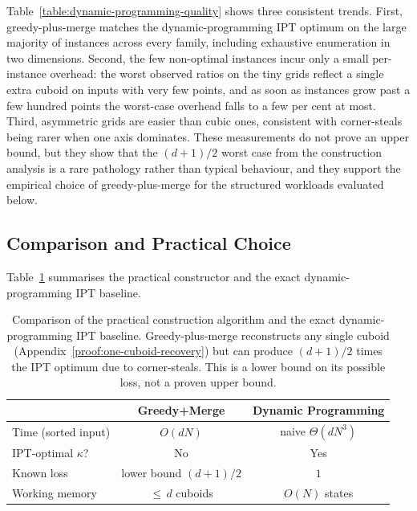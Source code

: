 \documentclass[manuscript,screen,review]{acmart}
\theoremstyle{definition}
\theoremstyle{plain}
\begin{document}
Table~\ref{table:dynamic-programming-quality} shows three consistent
trends. First, greedy-plus-merge matches the dynamic-programming
IPT optimum on the large majority of instances across every family,
including exhaustive enumeration in two dimensions. Second, the few
non-optimal instances incur only a small per-instance overhead: the
worst observed ratios on the tiny grids reflect a single extra cuboid
on inputs with very few points, and as soon as instances grow past a
few hundred points the worst-case overhead falls to a few per cent at
most. Third, asymmetric grids are easier than cubic ones, consistent
with corner-steals being rarer when one axis dominates. These
measurements do not prove an upper bound, but they show that the
$(d{+}1)/2$ worst case from the construction analysis is a rare
pathology rather than typical behaviour, and they support the
empirical choice of greedy-plus-merge for the structured workloads
evaluated below.

\subsection{Comparison and Practical Choice}

Table~\ref{table:algorithm-comparison} summarises the practical
constructor and the exact dynamic-programming IPT baseline.

\begin{table}[ht]
\begin{tabular}{lcc}
\toprule
 & Greedy+Merge & Dynamic Programming \\
\midrule
Time (sorted input) & $O(dN)$ & naive $\Theta(dN^3)$ \\
IPT-optimal $\kappa$? & No & Yes \\
Known loss & lower bound $(d{+}1)/2$ & $1$ \\
Working memory & ${\leq}\,d$ cuboids & $O(N)$ states \\
\bottomrule
\end{tabular}
\caption{Comparison of the practical construction algorithm and the
exact dynamic-programming IPT baseline. Greedy-plus-merge reconstructs any
single cuboid (Appendix~\ref{proof:one-cuboid-recovery}) but can
produce $(d{+}1)/2$ times the IPT optimum due to corner-steals. This is a
lower bound on its possible loss, not a proven upper bound.}
\label{table:algorithm-comparison}
\end{table}
\end{document}
